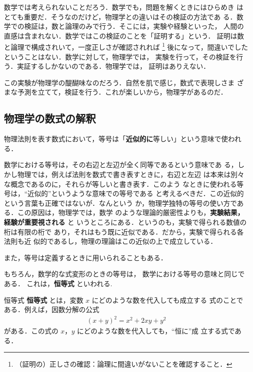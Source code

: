             数学では考えられないことだろう．数学でも，問題を解くときにはひらめき
            はとても重要だ．そうなのだけど，物理学との違いはその検証の方法であ
            る．数学での検証は，数と論理のみで行う．そこには，実験や経験といった，
            人間の直感は含まれない．数学ではこの検証のことを「証明する」という．
            証明は数と論理で構成されいて，一度正しさが確認されれば
                \footnote{
                    （証明の）正しさの確認：論理に間違いがないことを確認すること．
                }
            後になって，間違いでしたということはない．数学に対して，物理学では，
            実験を行って，その検証を行う．実証するしかないのである．物理学では，
            証明はありえない．

            この実験が物理学の醍醐味なのだろう．自然を肌で感じ，数式で表現しさま
            ざまな予測を立てて，検証を行う．これが楽しいから，物理学があるのだ．


        \subsection{物理学の数式の解釈}
            物理法則を表す数式において，等号は「\textbf{近似的に}等しい」という意味で使われる．

            数学における等号は，その右辺と左辺が全く同等であるという意味であ
            る，しかし物理では，例えば法則を数式で書き表すときに，右辺と左辺
            は本来は別々な概念であるのに，それらが等しいと書き表す．このよう
            なときに使われる等号は，“近似的”というような意味での等号である
            と考えるべきだ．この近似的という言葉も正確ではないが．なんという
            か，物理学独特の等号の使い方である．この原因は，物理学では，数学
            のような理論的厳密性よりも，\textbf{実験結果，経験が重要視される} と
            いうところにある．というのも，実験で得られる数値の桁は有限の桁で
            あり，それはもう既に近似である．だから，実験で得られる各法則も近
            似的であるし，物理の理論はこの近似の上で成立している．

            また，等号は定義するときに用いられることもある．

            もちろん，数学的な式変形のときの等号は，
            数学における等号の意味と同じである．
            これは，\textbf{恒等式} といわれる.

            \begin{memo}{恒等式}
                \textbf{恒等式} とは，変数 $x$ にどのような数を代入しても成立する
                式のことである．例えば，因数分解の公式
                    \begin{align}
                        {(x+y)}^{2}=x^{2} + 2xy + y^{2}
                    \end{align}
                がある．この式の $x$，$y$ にどのような数を代入しても，“恒に”成
                立する式である．
            \end{memo}

